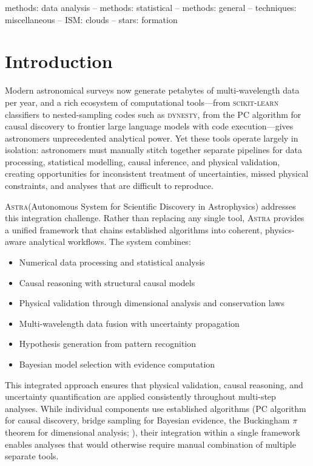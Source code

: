 \documentclass[fleqn,usenatbib]{mnras}
\newcommand{\astra}{\textsc{Astra}\xspace}
\newcommand{\pc}{PC\xspace}
\begin{document}
\begin{keywords}
methods: data analysis -- methods: statistical -- methods: general -- techniques: miscellaneous -- ISM: clouds -- stars: formation
\end{keywords}

\section{Introduction}
\label{sec:introduction}

Modern astronomical surveys now generate petabytes of multi-wavelength data per year, and a rich ecosystem of computational tools---from \textsc{scikit-learn} classifiers to nested-sampling codes such as \textsc{dynesty}, from the \pc algorithm for causal discovery \citep{Spirtes2000} to frontier large language models with code execution---gives astronomers unprecedented analytical power.
Yet these tools operate largely in isolation: astronomers must manually stitch together separate pipelines for data processing, statistical modelling, causal inference, and physical validation, creating opportunities for inconsistent treatment of uncertainties, missed physical constraints, and analyses that are difficult to reproduce.

\astra (Autonomous System for Scientific Discovery in Astrophysics) addresses this integration challenge.
Rather than replacing any single tool, \astra provides a unified framework that chains established algorithms into coherent, physics-aware analytical workflows.
The system combines:
\begin{itemize}
  \item Numerical data processing and statistical analysis
  \item Causal reasoning with structural causal models
  \item Physical validation through dimensional analysis and conservation laws
  \item Multi-wavelength data fusion with uncertainty propagation
  \item Hypothesis generation from pattern recognition
  \item Bayesian model selection with evidence computation
\end{itemize}

This integrated approach ensures that physical validation, causal reasoning, and uncertainty quantification are applied consistently throughout multi-step analyses.
While individual components use established algorithms (\pc algorithm for causal discovery, bridge sampling for Bayesian evidence, the Buckingham $\pi$ theorem for dimensional analysis; \citealt{Buckingham1914}), their integration within a single framework enables analyses that would otherwise require manual combination of multiple separate tools.
\end{document}

